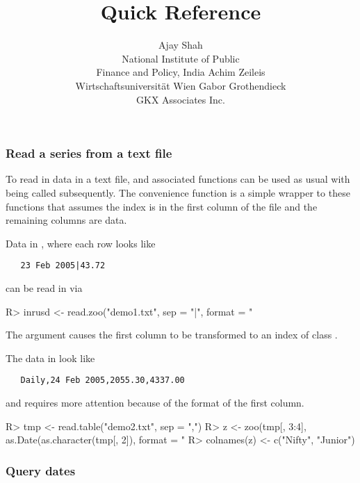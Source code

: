 \documentclass[article,nojss]{jss}
\author{Ajay Shah\\National Institute of Public\\Finance and Policy, India \And
        Achim Zeileis\\Wirtschaftsuniversit\"at Wien \And
        Gabor Grothendieck\\GKX Associates Inc.}
\title{\pkg{zoo} Quick Reference}
\newcommand{\mysection}[1]{\subsubsection[#1]{\textbf{#1}}}
\begin{document}



\mysection{Read a series from a text file}

To read in data in a text file,  and associated
functions can 
be used as usual with  being called subsequently.
The convenience function  is a simple wrapper to these
functions that assumes the index is in the first column of the file
and the remaining columns are data.

Data in , where each row looks like
\begin{verbatim}
   23 Feb 2005|43.72
\end{verbatim}
can be read in via
\begin{Schunk}
\begin{Sinput}
R> inrusd <- read.zoo("demo1.txt", sep = "|", format = "%d %b %Y")
\end{Sinput}
\end{Schunk}
The  argument causes the first column to be transformed
to an index of class .

The data in  look like
\begin{verbatim}
   Daily,24 Feb 2005,2055.30,4337.00
\end{verbatim}
and requires more attention because of the format of
the first column.
\begin{Schunk}
\begin{Sinput}
R> tmp <- read.table("demo2.txt", sep = ",")
R> z <- zoo(tmp[, 3:4], as.Date(as.character(tmp[, 2]), format = "%d %b %Y"))
R> colnames(z) <- c("Nifty", "Junior")
\end{Sinput}
\end{Schunk}

\mysection{Query dates}
\end{document}
